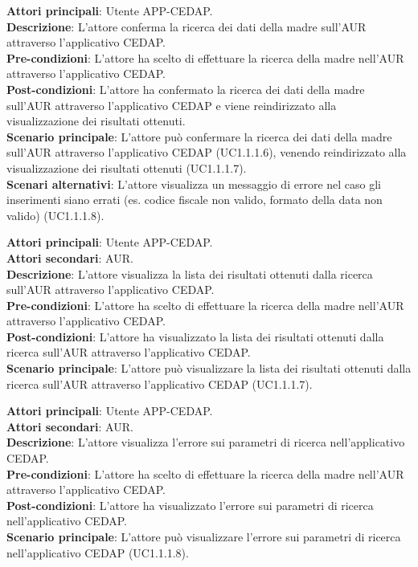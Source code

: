 \documentclass[a4paper]{article}
\newcounter{subsubsubsection}[subsubsection]
\begin{document}
\label{UC1.1.1.6}

\textbf{Attori principali}: Utente APP-CEDAP.
\\
\textbf{Descrizione}: L'attore conferma la ricerca dei dati della madre sull'AUR attraverso l'applicativo CEDAP.
\\
\textbf{Pre-condizioni}: L'attore ha scelto di effettuare la ricerca della madre nell'AUR attraverso l'applicativo CEDAP.
\\
\textbf{Post-condizioni}: L'attore ha confermato la ricerca dei dati della madre sull'AUR attraverso l'applicativo CEDAP e viene reindirizzato alla visualizzazione dei risultati ottenuti.
\\
\textbf{Scenario principale}: L'attore può confermare la ricerca dei dati della madre sull'AUR attraverso l'applicativo CEDAP (UC1.1.1.6), venendo reindirizzato alla visualizzazione dei risultati ottenuti (UC1.1.1.7).
\\
\textbf{Scenari alternativi}: L'attore visualizza un messaggio di errore nel caso gli inserimenti siano errati (es. codice fiscale non valido, formato della data non valido) (UC1.1.1.8).


\label{UC1.1.1.7}

\textbf{Attori principali}: Utente APP-CEDAP.
\\
\textbf{Attori secondari}: AUR.
\\
\textbf{Descrizione}: L'attore visualizza la lista dei risultati ottenuti dalla ricerca sull'AUR attraverso l'applicativo CEDAP.
\\
\textbf{Pre-condizioni}: L'attore ha scelto di effettuare la ricerca della madre nell'AUR attraverso l'applicativo CEDAP.
\\
\textbf{Post-condizioni}: L'attore ha visualizzato la lista dei risultati ottenuti dalla ricerca sull'AUR attraverso l'applicativo CEDAP.
\\
\textbf{Scenario principale}: L'attore può visualizzare la lista dei risultati ottenuti dalla ricerca sull'AUR attraverso l'applicativo CEDAP (UC1.1.1.7).


\label{UC1.1.1.8}

\textbf{Attori principali}: Utente APP-CEDAP.
\\
\textbf{Attori secondari}: AUR.
\\
\textbf{Descrizione}: L'attore visualizza l'errore sui parametri di ricerca nell'applicativo CEDAP.
\\
\textbf{Pre-condizioni}: L'attore ha scelto di effettuare la ricerca della madre nell'AUR attraverso l'applicativo CEDAP.
\\
\textbf{Post-condizioni}: L'attore ha visualizzato l'errore sui parametri di ricerca nell'applicativo CEDAP.
\\
\textbf{Scenario principale}: L'attore può visualizzare l'errore sui parametri di ricerca nell'applicativo CEDAP (UC1.1.1.8).
\end{document}
